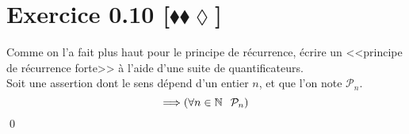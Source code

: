 \documentclass[10pt]{article}
\begin{document}
\section*{Exercice 0.10 [$\blacklozenge\blacklozenge\lozenge$]}
\begin{tcolorbox}[enhanced, width=7in, center, size=fbox, fontupper=\large, drop shadow southwest]
    Comme on l'a fait plus haut pour le principe de récurrence, écrire un <<principe de récurrence forte>> à l'aide d'une suite de quantificateurs.\\
    Soit une assertion dont le sens dépend d'un entier $n$, et que l'on note $\mathcal{P}_n$.
    \begin{equation*}
        [\forall{n\in\mathbb{N} \hspace{0.25cm}}(\forall{k\in[0, n] \hspace{0.25cm} \mathcal{P}_k}) \Rightarrow \mathcal{P}_{n+1}] \Longrightarrow (\forall{n\in\mathbb{N}} \hspace{0.25cm} \mathcal{P}_n)
    \end{equation*}
    \qed
\end{tcolorbox}
\end{document}
